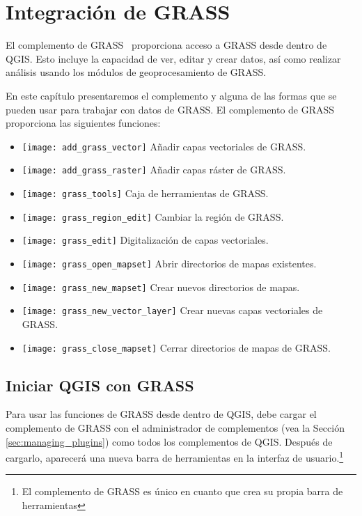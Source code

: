 ﻿
\section{Integración de GRASS}\label{sec:grass}

El complemento de GRASS~\cite{GRASSweb} proporciona acceso a GRASS desde dentro de QGIS. Esto incluye la capacidad de ver, editar y crear datos, así como realizar análisis usando los módulos de geoprocesamiento de GRASS.

En este capítulo presentaremos el complemento y alguna de las formas que se pueden usar para trabajar con datos de GRASS. El complemento de GRASS proporciona las siguientes funciones:
 
\begin{itemize}
\item \texttt{[image: add\_grass\_vector]} Añadir capas vectoriales de GRASS.
\item \texttt{[image: add\_grass\_raster]} Añadir capas ráster de GRASS.
\item \texttt{[image: grass\_tools]} Caja de herramientas de GRASS.
\item \texttt{[image: grass\_region\_edit]} Cambiar la región de GRASS.
\item \texttt{[image: grass\_edit]} Digitalización de capas vectoriales.
\item \texttt{[image: grass\_open\_mapset]} Abrir directorios de mapas existentes.
\item \texttt{[image: grass\_new\_mapset]} Crear nuevos directorios de mapas.
\item \texttt{[image: grass\_new\_vector\_layer]} Crear nuevas capas vectoriales de GRASS.
\item \texttt{[image: grass\_close\_mapset]} Cerrar directorios de mapas de GRASS.
\end{itemize}

\subsection{Iniciar QGIS con GRASS}\label{sec:starting_grass}

Para usar las funciones de GRASS desde dentro de QGIS, debe cargar el complemento de GRASS con el administrador de complementos (vea la Sección \ref{sec:managing_plugins}) como todos los complementos de QGIS. Después de cargarlo, aparecerá una nueva barra de herramientas en la interfaz de usuario.\footnote{El complemento de GRASS es único en cuanto que crea su propia barra de herramientas}

